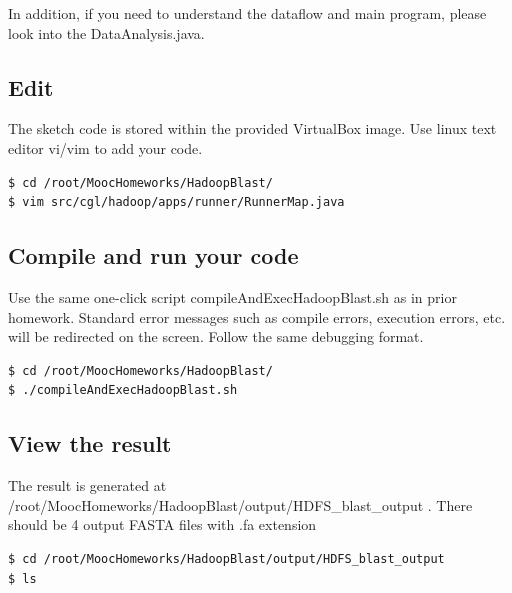 In addition, if you need to understand the dataflow and main program, please
look into the DataAnalysis.java.




\subsection{Edit}
The sketch code is stored within the provided VirtualBox image. Use linux text
editor vi/vim to add your code.

\begin{lstlisting}[language=bash]
$ cd /root/MoocHomeworks/HadoopBlast/
$ vim src/cgl/hadoop/apps/runner/RunnerMap.java
\end{lstlisting}

\subsection{Compile and run your code}
Use the same one-click script compileAndExecHadoopBlast.sh as in prior
homework. Standard error messages such as compile errors, execution errors,
etc. will be redirected on the screen. Follow the same debugging format.

\begin{lstlisting}[language=bash]
$ cd /root/MoocHomeworks/HadoopBlast/
$ ./compileAndExecHadoopBlast.sh 
\end{lstlisting}

\subsection{View the result} 
The result is generated at
/root/MoocHomeworks/HadoopBlast/output/HDFS\_blast\_output . There should be 4
output FASTA files with .fa extension

\begin{lstlisting}[language=bash]
$ cd /root/MoocHomeworks/HadoopBlast/output/HDFS_blast_output
$ ls
\end{lstlisting}
